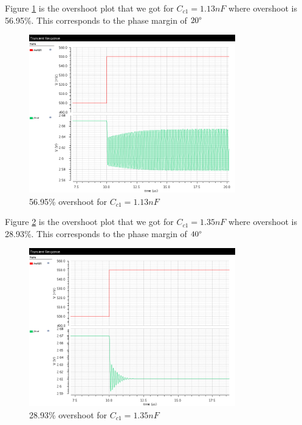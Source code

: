 \documentclass[a4paper,english,11pt]{article}
\begin{document}
Figure \ref{pm20} is the overshoot plot that we got for  $C_{c1} = 1.13 nF$ where overshoot is 56.95\%. This corresponds to the phase margin of $20\degree$
\begin{figure}[H]
 \centering
  \includegraphics[width=0.8\textwidth]{img/cad_pm/pm_20_1_13nF.png}
  \caption{56.95\% overshoot for $C_{c1} = 1.13nF$}
  \label{pm20}	
\end{figure}

Figure \ref{pm40} is the overshoot plot that we got for  $C_{c1} = 1.35 nF$ where overshoot is 28.93\%. This corresponds to the phase margin of $40\degree$
\begin{figure}[H]
 \centering
  \includegraphics[width=0.8\textwidth]{img/cad_pm/pm_40_1_35nF.png}
  \caption{28.93\% overshoot for $C_{c1} = 1.35nF$}
  \label{pm40}	
\end{figure}
\end{document}
